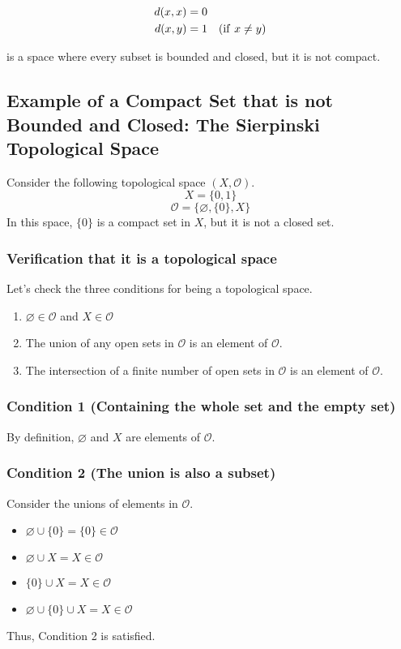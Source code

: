 \documentclass{article}
\begin{document}
\begin{align*}
	d(x, x) & = 0                             \\
	d(x, y) & = 1 \ \ \ ({\rm if} \ x \neq y)
\end{align*}

is a space where every subset is bounded and closed, but it is not compact.


\subsection{Example of a Compact Set that is not Bounded and Closed: The Sierpinski Topological Space}

Consider the following topological space $(X, \mathcal{O})$.
$$X = \{0, 1\}$$
$$\mathcal{O} = \{\varnothing, \{0\}, X\}$$
In this space, $\{0\}$ is a compact set in $X$, but it is not a closed set.

\subsubsection{Verification that it is a topological space}

Let's check the three conditions for being a topological space.
\begin{enumerate}
	\item $\varnothing \in \mathcal{O}$ and $X \in \mathcal{O}$
	\item The union of any open sets in $\mathcal{O}$ is an element of $\mathcal{O}$.
	\item The intersection of a finite number of open sets in $\mathcal{O}$ is an element of $\mathcal{O}$.
\end{enumerate}

\subsubsection{Condition 1 (Containing the whole set and the empty set)}
By definition, $\varnothing$ and $X$ are elements of $\mathcal{O}$.

\subsubsection{Condition 2 (The union is also a subset)}
Consider the unions of elements in $\mathcal{O}$.
\begin{itemize}
	\item $\varnothing \cup \{0\} = \{0\} \in \mathcal{O}$
	\item $\varnothing \cup X = X \in \mathcal{O}$
	\item $\{0\} \cup X = X \in \mathcal{O}$
	\item $\varnothing \cup \{0\} \cup X = X \in \mathcal{O}$
\end{itemize}
Thus, Condition 2 is satisfied.
\end{document}
